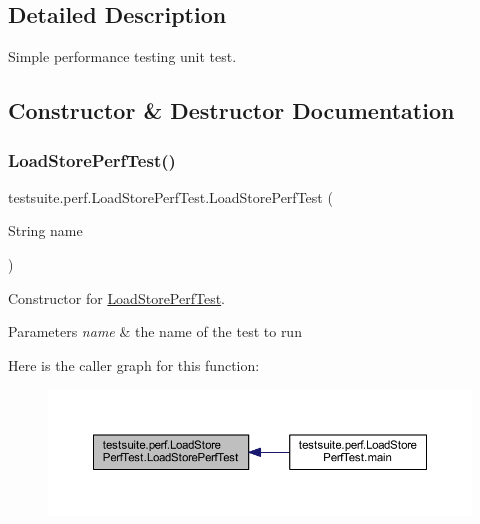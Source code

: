 \subsection{Detailed Description}
Simple performance testing unit test. 

\subsection{Constructor \& Destructor Documentation}
\mbox{\label{classtestsuite_1_1perf_1_1_load_store_perf_test_afe1fdb0e449dd028376e94eaaa9d9b68}} 
\subsubsection{\texorpdfstring{Load\+Store\+Perf\+Test()}{LoadStorePerfTest()}}
{\footnotesize\ttfamily testsuite.\+perf.\+Load\+Store\+Perf\+Test.\+Load\+Store\+Perf\+Test (\begin{DoxyParamCaption}\item[{String}]{name }\end{DoxyParamCaption})}

Constructor for \mbox{\hyperlink{classtestsuite_1_1perf_1_1_load_store_perf_test}{Load\+Store\+Perf\+Test}}.


\begin{DoxyParams}{Parameters}
{\em name} & the name of the test to run \\
\hline
\end{DoxyParams}
Here is the caller graph for this function\+:
\nopagebreak
\begin{figure}[H]
\begin{center}
\leavevmode
\includegraphics[width=350pt]{classtestsuite_1_1perf_1_1_load_store_perf_test_afe1fdb0e449dd028376e94eaaa9d9b68_icgraph}
\end{center}
\end{figure}


